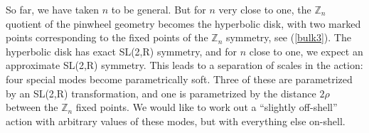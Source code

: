 \documentclass[11pt]{article}
\newcommand{\be}{\begin{equation}}
\newcommand{\ee}{\end{equation}}
\numberwithin{equation}{section}
\begin{document}

So far, we have taken $n$ to be general. But for $n$ very close to one, the $\mathbb{Z}_n$ quotient of the pinwheel geometry becomes the hyperbolic disk, with two marked points corresponding to the fixed points of the $\mathbb{Z}_n$ symmetry, see (\ref{bulk3}). The hyperbolic disk has exact SL(2,R) symmetry, and for $n$ close to one, we expect an approximate SL(2,R) symmetry. This leads to a separation of scales in the action: four special modes become parametrically soft. Three of these are parametrized by an SL(2,R) transformation, and one is parametrized by the distance $2\rho$ between the $\mathbb{Z}_n$ fixed points. We would like to work out a ``slightly off-shell'' action with arbitrary values of these modes, but with everything else on-shell.
\end{document}
